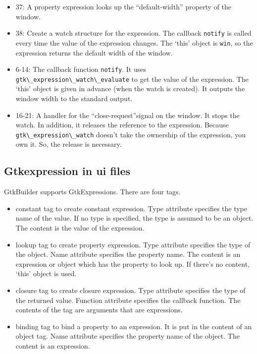 \begin{itemize}
\tightlist
\item
  37: A property expression looks up the ``default-width'' property of
  the window.
\item
  38: Create a watch structure for the expression. The callback
  \passthrough{\lstinline!notify!} is called every time the value of the
  expression changes. The `this' object is
  \passthrough{\lstinline!win!}, so the expression returns the default
  width of the window.
\item
  6-14: The callback function \passthrough{\lstinline!notify!}. It uses
  \passthrough{\lstinline!gtk\_expression\_watch\_evaluate!} to get the
  value of the expression. The `this' object is given in advance (when
  the watch is created). It outputs the window width to the standard
  output.
\item
  16-21: A handler for the ``close-request''signal on the window. It
  stops the watch. In addition, it releases the reference to the
  expression. Because \passthrough{\lstinline!gtk\_expression\_watch!}
  doesn't take the ownership of the expression, you own it. So, the
  release is necessary.
\end{itemize}

\subsection{Gtkexpression in ui files}\label{gtkexpression-in-ui-files}

GtkBuilder supports GtkExpressions. There are four tags.

\begin{itemize}
\tightlist
\item
  constant tag to create constant expression. Type attribute specifies
  the type name of the value. If no type is specified, the type is
  assumed to be an object. The content is the value of the expression.
\item
  lookup tag to create property expression. Type attribute specifies the
  type of the object. Name attribute specifies the property name. The
  content is an expression or object which has the property to look up.
  If there's no content, `this' object is used.
\item
  closure tag to create closure expression. Type attribute specifies the
  type of the returned value. Function attribute specifies the callback
  function. The contents of the tag are arguments that are expressions.
\item
  binding tag to bind a property to an expression. It is put in the
  content of an object tag. Name attribute specifies the property name
  of the object. The content is an expression.
\end{itemize}

